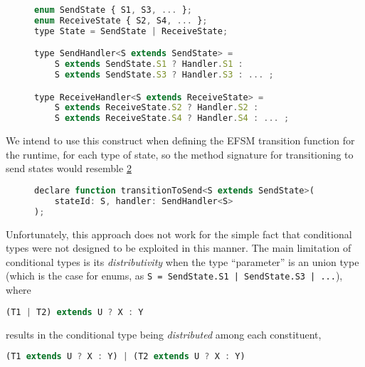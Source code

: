 \begin{figure}[!h]
\begin{lstlisting}[language=javascript,tabsize=2]
enum SendState { S1, S3, ... };
enum ReceiveState { S2, S4, ... };
type State = SendState | ReceiveState;

type SendHandler<S extends SendState> = 
	S extends SendState.S1 ? Handler.S1 :
	S extends SendState.S3 ? Handler.S3 : ... ;

type ReceiveHandler<S extends ReceiveState> = 
	S extends ReceiveState.S2 ? Handler.S2 :
	S extends ReceiveState.S4 ? Handler.S4 : ... ;
\end{lstlisting}
\label{lst:conditionaltypes}
\end{figure}

We intend to use this construct when defining the EFSM transition
function for the runtime, for each type of state,
so the method signature for transitioning to send states
would resemble \cref{lst:conditionaltransitionfunction}

\begin{figure}[!h]
\begin{lstlisting}[language=javascript,numbers=none]
declare function transitionToSend<S extends SendState>(
	stateId: S, handler: SendHandler<S>
);
\end{lstlisting}
\label{lst:conditionaltransitionfunction}
\end{figure}

Unfortunately, this approach does not work for the simple fact that
conditional types were not designed to be exploited in this manner.
The main limitation of conditional types is its 
\textit{distributivity} when the type ``parameter'' is an
union type (which is the case for enums, as
\texttt{S = SendState.S1 | SendState.S3 | ...}), where

\begin{lstlisting}[language=javascript,numbers=none]
(T1 | T2) extends U ? X : Y
\end{lstlisting}

results in the conditional type being \textit{distributed}
among each constituent,

\begin{lstlisting}[language=javascript,numbers=none]
(T1 extends U ? X : Y) | (T2 extends U ? X : Y)
\end{lstlisting}

